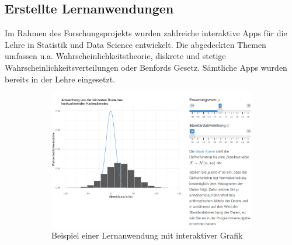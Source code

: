 \documentclass[a0,portrait]{a0poster}
\begin{document}
\begin{multicols}{2}
\section*{Erstellte Lernanwendungen}

Im Rahmen des Forschungsprojekts wurden zahlreiche interaktive Apps für die Lehre in Statistik und Data Science entwickelt. Die abgedeckten Themen umfassen u.a. Wahrscheinlichkeitstheorie, diskrete und stetige Wahrscheinlichkeitsverteilungen oder Benfords Gesetz. Sämtliche Apps wurden bereits in der Lehre eingesetzt.

\vspace{1cm}

\begin{figure}[H]
\hfill
\begin{subfigure}[h]{0.6\linewidth}
\includegraphics[width=\linewidth]{wvstetig}
\caption{Beispiel einer Lernanwendung mit interaktiver Grafik}
\end{subfigure}
\hfill
\begin{subfigure}[h]{0.3\linewidth}

\end{subfigure}
\end{figure}
\end{multicols}
\end{document}
